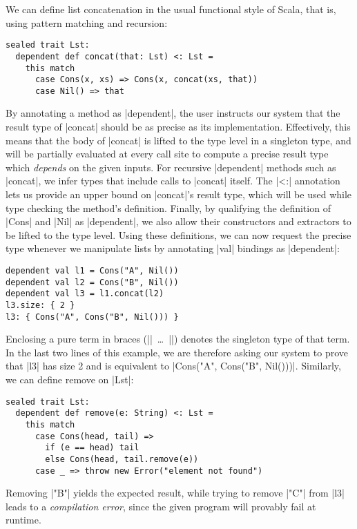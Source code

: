 \noindent
We can define list concatenation in the usual functional style of Scala, that is, using pattern matching and recursion:

\begin{lstlisting}
sealed trait Lst:
  dependent def concat(that: Lst) <: Lst =
    this match
      case Cons(x, xs) => Cons(x, concat(xs, that))
      case Nil() => that
\end{lstlisting}

\noindent
By annotating a method as |dependent|, the user instructs our system that the result type of |concat| should be as precise as its implementation.
Effectively, this means that the body of |concat| is lifted to the type level in a singleton type, and will be partially evaluated at every call site to compute a precise result type which \emph{depends} on the given inputs.
For recursive |dependent| methods such as |concat|, we infer types that include calls to |concat| itself.
The |<:| annotation lets us provide an upper bound on |concat|'s result type, which will be used while type checking the method's definition.
Finally, by qualifying the definition of |Cons| and |Nil| as |dependent|, we also allow their constructors and extractors to be lifted to the type level.
Using these definitions, we can now request the precise type whenever we manipulate lists by annotating |val| bindings as |dependent|:

\begin{lstlisting}
dependent val l1 = Cons("A", Nil())
dependent val l2 = Cons("B", Nil())
dependent val l3 = l1.concat(l2)
l3.size: { 2 }
l3: { Cons("A", Cons("B", Nil())) }
\end{lstlisting}

Enclosing a pure term in braces (|{|~\ldots{}~|}|) denotes the singleton type of that term.
In the last two lines of this example, we are therefore asking our system to prove that |l3| has size 2 and is equivalent to |Cons("A", Cons("B", Nil()))|.
Similarly, we can define remove on |Lst|:

\begin{lstlisting}
sealed trait Lst:
  dependent def remove(e: String) <: Lst =
    this match
      case Cons(head, tail) =>
        if (e == head) tail
        else Cons(head, tail.remove(e))
      case _ => throw new Error("element not found")
\end{lstlisting}

\noindent
Removing |"B"| yields the expected result, while trying to remove |"C"| from |l3| leads to a \emph{compilation error}, since the given program will provably fail at runtime.

